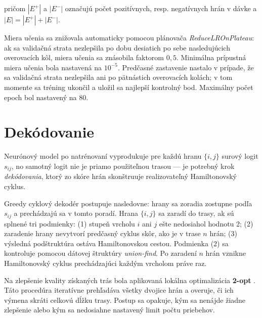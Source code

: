 \noindent pričom \(|E^+|\) a \(|E^-|\) označujú počet pozitívnych,
resp. negatívnych hrán v dávke a \(|E| = |E^+| + |E^-|\).

\begin{symboltable}
\end{symboltable}

\indent Miera učenia sa znižovala automaticky pomocou plánovača
\textit{ReduceLROnPlateau}: ak sa validačná strata nezlepšila po dobu
desiatich po sebe nasledujúcich overovacích kôl, miera učenia sa
znásobila faktorom \(0{,}5\). Minimálna prípustná miera učenia bola
nastavená na \(10^{-5}\). Predčasné zastavenie nastalo v prípade,
že sa validačná strata nezlepšila ani po pätnástich overovacích kolách;
v tom momente sa tréning ukončil a uložil sa najlepší kontrolný bod.
Maximálny počet epoch bol nastavený na 80.

\section{Dekódovanie}
\label{sec:dekodovanie}

\indent Neurónový model po natrénovaní vyprodukuje pre každú hranu
\(\{i,j\}\) surový logit \(s_{ij}\), no samotný logit nie je
priamo použiteľnou trasou — je potrebný krok \emph{dekódovania},
ktorý zo skóre hrán skonštruuje realizovateľný Hamiltonovský cyklus.

\indent Greedy cyklový dekodér postupuje nasledovne: hrany sa zoradia
zostupne podľa \(s_{ij}\) a prechádzajú sa v tomto poradí. Hrana
\(\{i,j\}\) sa zaradí do trasy, ak sú splnené tri podmienky: (1) stupeň
vrcholu \(i\) ani \(j\) ešte nedosiahol hodnotu 2; (2) zaradenie hrany
nevytvorí predčasný cyklus skôr, ako je v trase \(n\) hrán; (3) výsledná
podštruktúra ostáva Hamiltonovskou cestou. Podmienka (2) sa kontroluje
pomocou dátovej štruktúry \textit{union-find}. Po zaradení \(n\) hrán
vznikne Hamiltonovský cyklus prechádzajúci každým vrcholom práve raz.

\indent Na zlepšenie kvality získaných trás bola aplikovaná lokálna
optimalizácia \textbf{2-opt} \parencite{croes1958twoopt}. Táto procedúra
iteratívne prehľadáva všetky dvojice hrán a overuje, či ich výmena
skráti celkovú dĺžku trasy. Postup sa opakuje, kým sa nenájde žiadne
zlepšenie alebo kým sa nedosiahne nastavený limit počtu priebehov.

